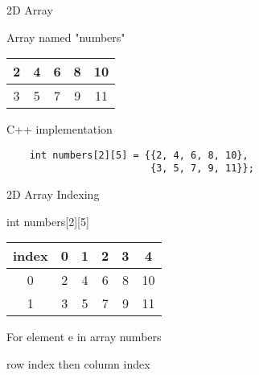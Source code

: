 \documentclass[xcolor={dvipsnames}]{beamer}
\begin{document}
\begin{frame}[fragile]{2D Array}
	\begin{block}{Array named "numbers"}
	\begin{table}
	\Huge
	\begin{tabular}{|c|c|c|c|c|}
	\hline
	2  & 4 & 6 & 8 & 10\\
	\hline
	3  & 5 & 7 & 9 & 11\\
	\hline
	\end{tabular}
	\end{table}
	\end{block}
	\pause
	\begin{block}{C++ implementation}
	\begin{verbatim}
	int numbers[2][5] = {{2, 4, 6, 8, 10},
	                     {3, 5, 7, 9, 11}};
	\end{verbatim}
	\end{block}
\end{frame}

\begin{frame}{2D Array Indexing}
	\begin{block}{int numbers[2][5]}
	\begin{table}
	\Huge
	\begin{tabular}{|c|c|c|c|c|c|}
	\hline
	{\color{red}index} &  {\color{red} 0}   &  {\color{red} 1}  &   {\color{red} 2}  &    {\color{red} 3}  &  {\color{red} 4} \\

	\hline
	 {\color{red} 0} & 2  & 4 & 6 & 8 & 10\\
	\hline
	 {\color{red} 1}  & 3  & 5 & 7 & 9 & 11\\
	\hline
	\end{tabular}
	\end{table}
	\end{block}
	\pause
	\begin{block}{For element e in array numbers}
		\begin{center}
		row index then column index
		\end{center}
	\end{block}
\end{frame}
\end{document}
